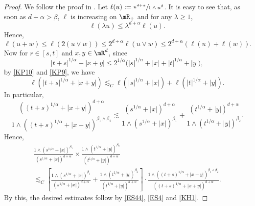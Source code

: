 \begin{proof}
We follow the proof in \cite{Ch-Zh20}.
Let $\ell(u):=\sfrac{u^{d+\alpha}}{1\wedge u^{\beta}}$. It is easy to see that, as soon as $d+\alpha>\beta $, $\ell$ is increasing on $\mR_+$ and
for any $\lambda\geq 1$,
\begin{equation}\label{KP10}
\ell(\lambda u)\leq \lambda^{d+\alpha}\ell(u).
\end{equation}
Hence,\vspace*{-3pt}
\begin{equation}\label{KP9}
\ell(u+w)\leq \ell(2(u\vee w))\leq 2^{d+\alpha}\ell(u\vee w)\leq 2^{d+\alpha}(\ell(u)+\ell(w)).
\end{equation}
Now for $r\in[s,t]$ and $x,y\in\mR^d$, since
\[
|t+s|^{1/\alpha}+|x+y|\leq 2^{1/\alpha}\bigl(|s|^{1/\alpha}+|x|+|t|^{1/\alpha}+|y|\bigr),
\]
by \eqref{KP10} and \eqref{KP9}, we have
\begin{equation*}
\ell(|t+s|^{1/\alpha}+|x+y|)\lesssim_C\ell(|s|^{1/\alpha}+|x|)+\ell(|t|^{1/\alpha}+|y|).
\end{equation*}
In particular,
\begin{equation*}
\frac{((t+s)^{1/\alpha}+|x+y|)^{d+\alpha}}{1\wedge ((t+s)^{1/\alpha}+|x+y|)^{\beta_1\wedge\beta_2}}
\lesssim\frac{(s^{1/\alpha}+|x|)^{d+\alpha}}{1\wedge (s^{1/\alpha}+|x|)^{\beta_1}}
+\frac{(t^{1/\alpha}+|y|)^{d+\alpha}}{1\wedge (t^{1/\alpha}+|y|)^{\beta_2}}.
\end{equation*}
Hence,\vspace*{-3pt}
\begin{multline*}
\frac{1\wedge (s^{1/\alpha}+|x|)^{\beta_1}}{(s^{1/\alpha}+|x|)^{d+\alpha}}\times\frac{1\wedge (t^{1/\alpha}+|y|)^{\beta_2}}{(t^{1/\alpha}+|y|)^{d+\alpha}}\\
\lesssim_C\left[\frac{1\wedge (s^{1/\alpha}+|x|)^{\beta_1}}{(s^{1/\alpha}+|x|)^{d+\alpha}}
+\frac{1\wedge (t^{1/\alpha}+|y|)^{\beta_2}}{(t^{1/\alpha}+|y|)^{d+\alpha}}\right]\cdot\frac{1\wedge ((t+s)^{1/\alpha}+|x+y|)^{\beta_1\wedge\beta_2}}{((t+s)^{1/\alpha}+|x+y|)^{d+\alpha}}.
\end{multline*}
By this, the desired estimates follow by \eqref{ES44}, \eqref{ES4} and \eqref{KH1}.
\end{proof}

